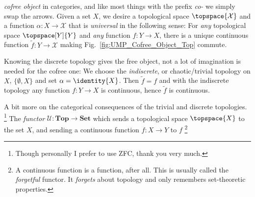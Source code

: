 \documentclass{book}                                                           %
\begin{document}
                \textit{cofree object} in categories, and like most things with
                the prefix \textit{co-} we simply swap the arrows. Given a set
                $X$, we desire a topological space $\topspace{\mathcal{X}}$ and
                a function $\alpha:X\rightarrow\mathcal{X}$ that is
                \textit{universal} in the following sense: For \textit{any}
                topological space $\topspace[Y]{Y}$ and \textit{any} function
                $f:Y\rightarrow{X}$, there is a unique continuous function
                $\tilde{f}:Y\rightarrow\mathcal{X}$ making
                Fig.~\ref{fig:UMP_Cofree_Object_Top} commute.
                \par\hfill\par
                \begin{minipage}[b]{0.56\textwidth}
                    Knowing the discrete topology gives the free object, not a
                    lot of imagination is needed for the cofree one: We choose
                    the \textit{indiscrete}, or chaotic/trivial topology on $X$,
                    $\{\emptyset,X\}$ and set $\alpha=\identity{X}$. Then
                    $\tilde{f}=f$ and with the indiscrete topology any function
                    $f:Y\rightarrow{X}$ is continuous, hence $\tilde{f}$ is
                    continuous.
                \end{minipage}
                \hfill
                \par\vspace{2.5ex}
                A bit more on the categorical consequences of the trivial and
                discrete topologies.%
                \footnote{%
                    Though personally I prefer to use ZFC, thank you very much.%
                }
                The \textit{functor} $\mathscr{U}:\mathbf{Top}\rightarrow\mathbf{Set}$
                which sends a topological space $\topspace{X}$ to the set $X$,
                and sending a continuous function $f:X\rightarrow{Y}$ to $f$%
                \footnote{%
                    A continuous function is a function, after all. This is
                    usually called the \textit{forgetful} functor. It
                    \textit{forgets} about topology and only remembers
                    set-theoretic properties.%
                }
\end{document}
